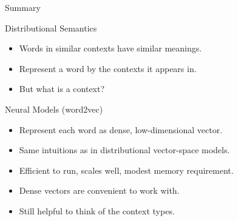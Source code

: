 \documentclass[compress]{beamer}
\begin{document}
\begin{frame}{Summary}
    \begin{block}{Distributional Semantics}
        \begin{itemize}
            \item Words in similar contexts have similar meanings.
            \item Represent a word by the contexts it appears in.
            \item But what is a context?
        \end{itemize}
    \end{block}
    \begin{block}{Neural Models (word2vec)}
        \begin{itemize}
            \item Represent each word as dense, low-dimensional vector.
            \item Same intuitions as in distributional vector-space models.
            \item Efficient to run, scales well, modest memory requirement.
            \item Dense vectors are convenient to work with.
            \item Still helpful to think of the context types.
        \end{itemize}
    \end{block}
\end{frame}
\end{document}
